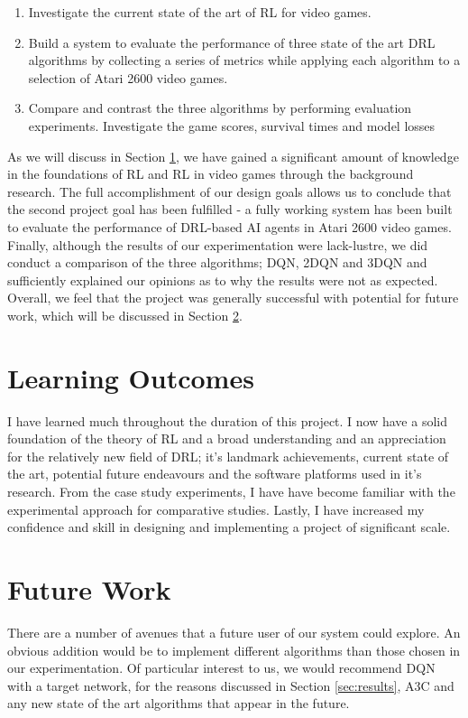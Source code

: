 \begin{enumerate}
	\item Investigate the current state of the art of RL for video games.
	\item Build a system to evaluate the performance of three state of the art DRL algorithms by collecting a series of metrics while applying each algorithm to a selection of Atari 2600 video games. 
	\item Compare and contrast the three algorithms by performing evaluation experiments. Investigate the game scores, survival times and model losses
\end{enumerate}

As we will discuss in Section \ref{sec:learning}, we have gained a significant amount of knowledge in the foundations of RL and RL in video games through the background research. The full accomplishment of our design goals allows us to conclude that the second project goal has been fulfilled - a fully working system has been built to evaluate the performance of DRL-based AI agents in Atari 2600 video games. Finally, although the results of our experimentation were lack-lustre, we did conduct a comparison of the three algorithms; DQN, 2DQN and 3DQN and sufficiently explained our opinions as to why the results were not as expected. Overall, we feel that the project was generally successful with potential for future work, which will be discussed in Section \ref{sec:future_work}.

\section{Learning Outcomes} \label{sec:learning}
I have learned much throughout the duration of this project. I now have a solid foundation of the theory of RL and a broad understanding and an appreciation for the relatively new field of DRL; it's landmark achievements, current state of the art, potential future endeavours and the software platforms used in it's research. From the case study experiments, I have have become familiar with the experimental approach for comparative studies. Lastly, I have increased my confidence and skill in designing and implementing a project of significant scale.

\section{Future Work} \label{sec:future_work}
There are a number of avenues that a future user of our system could explore. An obvious addition would be to implement different algorithms than those chosen in our experimentation. Of particular interest to us, we would recommend DQN with a target network, for the reasons discussed in Section \ref{sec:results}, A3C and any new state of the art algorithms that appear in the future. \paragraph{}

